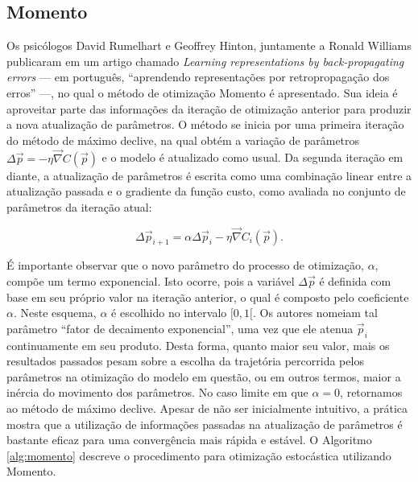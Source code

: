     \subsection{Momento} \label{s:momento}

      Os psicólogos David Rumelhart e Geoffrey Hinton, juntamente a Ronald Williams publicaram em  um artigo chamado \textit{Learning representations by back-propagating errors} --- em português, ``aprendendo representações por retropropagação dos erros'' ---, no qual o método de otimização Momento é apresentado. Sua ideia é aproveitar parte das informações da iteração de otimização anterior para produzir a nova atualização de parâmetros. O método se inicia por uma primeira iteração do método de máximo declive, na qual obtém a variação de parâmetros $\Delta \vec{p} = -\eta \vec{\nabla} C(\vec{p})$ e o modelo é atualizado como usual. Da segunda iteração em diante, a atualização de parâmetros é escrita como uma combinação linear entre a atualização passada e o gradiente da função custo, como avaliada no conjunto de parâmetros da iteração atual:

      \begin{equation} \label{e:atualizacao_momento}
        \Delta \vec{p}_{i+1} = \alpha \Delta\vec{p}_i - \eta \vec{\nabla} C_i(\vec{p})
        .
      \end{equation}

    É importante observar que o novo parâmetro do processo de otimização, $\alpha$, compõe um termo exponencial. Isto ocorre, pois a variável $\Delta \vec{p}$ é definida com base em seu próprio valor na iteração anterior, o qual é composto pelo coeficiente $\alpha$. Neste esquema, $\alpha$ é escolhido no intervalo $[0,1[$. Os autores nomeiam tal parâmetro ``fator de decaimento exponencial'', uma vez que ele atenua $\vec{p}_i$ continuamente em seu produto. Desta forma, quanto maior seu valor, mais os resultados passados pesam sobre a escolha da trajetória percorrida pelos parâmetros na otimização do modelo em questão, ou em outros termos, maior a inércia do movimento dos parâmetros. No caso limite em que $\alpha = 0$, retornamos ao método de máximo declive. Apesar de não ser inicialmente intuitivo, a prática mostra que a utilização de informações passadas na atualização de parâmetros é bastante eficaz para uma convergência mais rápida e estável. O Algoritmo \ref{alg:momento} descreve o procedimento para otimização estocástica utilizando Momento.

